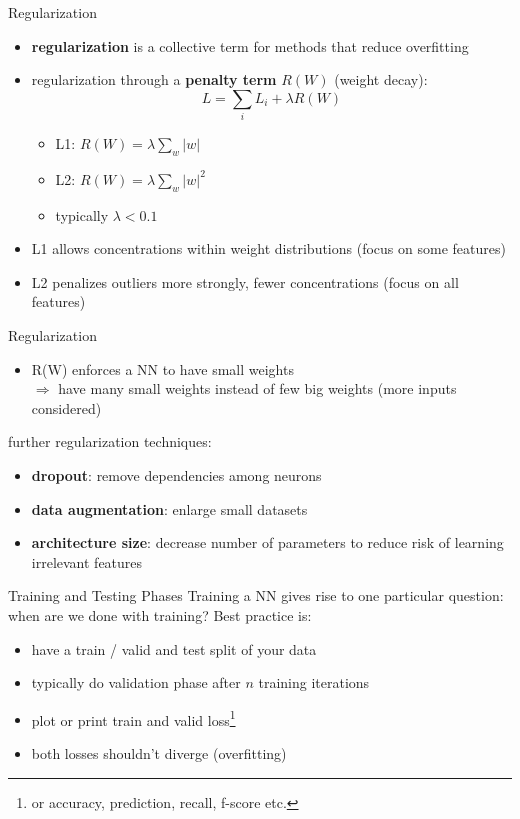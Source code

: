 \documentclass{beamer}
\begin{document}
\begin{frame}{Regularization}
\begin{itemize}
\item \textbf{regularization} is a collective term for methods that reduce overfitting
\item regularization through a \textbf{penalty term} $R(W)$ (weight decay):
\begin{equation}
 L = \sum_i L_i + \lambda R(W)
\end{equation}

\begin{itemize}
\item L1: $R(W) = \lambda \sum_w |w|$
\item L2: $R(W) = \lambda \sum_w |w|^2$
\item typically $\lambda < 0.1$
\end{itemize}
\item L1 allows concentrations within weight distributions (focus on some features)
\item L2 penalizes outliers more strongly, fewer concentrations (focus on all features)
\end{itemize}
\end{frame}


\begin{frame}{Regularization}
\begin{itemize}
\item R(W) enforces a NN to have small weights\\
$\Rightarrow$ have many small weights instead of few big weights (more inputs considered)
\end{itemize}
further regularization techniques:
\begin{itemize}
\item \textbf{dropout}: remove dependencies among neurons
\item \textbf{data augmentation}: enlarge small datasets
\item \textbf{architecture size}: decrease number of parameters to reduce risk of learning irrelevant features 
\end{itemize}
\end{frame}

\begin{frame}{Training and Testing Phases}
Training a NN gives rise to one particular question: when are we done with training? Best practice is: 
\begin{itemize}
\item have a train / valid and test split of your data
\item typically do validation phase after $n$ training iterations
\item plot or print train and valid loss\footnote{or accuracy, prediction, recall, f-score etc.}
\item both losses shouldn't diverge (overfitting)
\end{itemize}
\end{frame}
\end{document}

